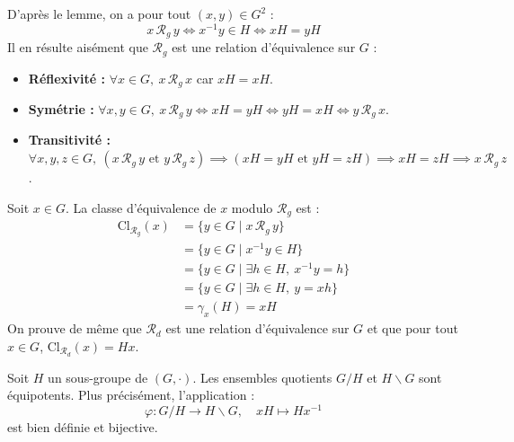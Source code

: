 \documentclass[a4paper,11pt]{article}
\begin{document}
\begin{demonstration}
D'après le lemme, on a pour tout $(x, y) \in G^2$ :
\[
x \, \mathcal{R}_g \, y \iff x^{-1} y \in H \iff xH = yH
\]
Il en résulte aisément que $\mathcal{R}_g$ est une relation d'équivalence sur $G$ :
\begin{itemize}
    \item \textbf{Réflexivité :} $\forall x \in G, \ x \, \mathcal{R}_g \, x$ car $xH = xH$.
    \item \textbf{Symétrie :} $\forall x, y \in G, \ x \, \mathcal{R}_g \, y \iff xH = yH \iff yH = xH \iff y \, \mathcal{R}_g \, x$.
    \item \textbf{Transitivité :} $\forall x, y, z \in G, \ (x \, \mathcal{R}_g \, y \text{ et } y \, \mathcal{R}_g \, z) \implies (xH = yH \text{ et } yH = zH) \implies xH = zH \implies x \, \mathcal{R}_g \, z$.
\end{itemize}
Soit $x \in G$. La classe d'équivalence de $x$ modulo $\mathcal{R}_g$ est :
\begin{align*}
    \mathrm{Cl}_{\mathcal{R}_g}(x) &= \{ y \in G \mid x \, \mathcal{R}_g \, y \} \\
                                   &= \{ y \in G \mid x^{-1} y \in H \} \\
                                   &= \{ y \in G \mid \exists h \in H, \ x^{-1} y = h \} \\
                                   &= \{ y \in G \mid \exists h \in H, \ y = xh \} \\
                                   &= \gamma_x(H) = xH
\end{align*}
On prouve de même que $\mathcal{R}_d$ est une relation d'équivalence sur $G$ et que pour tout $x \in G$, $\mathrm{Cl}_{\mathcal{R}_d}(x) = Hx$.
\end{demonstration}

\begin{proposition}
Soit $H$ un sous-groupe de $(G, \cdot)$. Les ensembles quotients $G / H$ et $H \backslash G$ sont équipotents. Plus précisément, l'application :
\[
\varphi : G / H \longrightarrow H \backslash G, \quad xH \longmapsto Hx^{-1}
\]
est bien définie et bijective.
\end{proposition}
\end{document}
